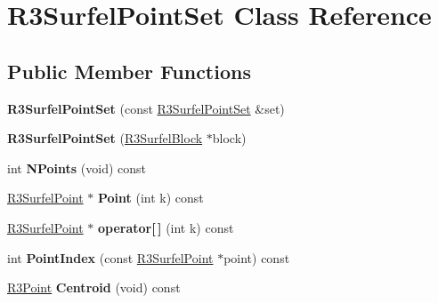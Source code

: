\hypertarget{class_r3_surfel_point_set}{}\section{R3\+Surfel\+Point\+Set Class Reference}
\label{class_r3_surfel_point_set}
\subsection*{Public Member Functions}
\begin{DoxyCompactItemize}
\item 
{\bfseries R3\+Surfel\+Point\+Set} (const \hyperlink{class_r3_surfel_point_set}{R3\+Surfel\+Point\+Set} \&set)\hypertarget{class_r3_surfel_point_set_aca27752edf5a20cb006bf2dd861d1ab7}{}\label{class_r3_surfel_point_set_aca27752edf5a20cb006bf2dd861d1ab7}

\item 
{\bfseries R3\+Surfel\+Point\+Set} (\hyperlink{class_r3_surfel_block}{R3\+Surfel\+Block} $\ast$block)\hypertarget{class_r3_surfel_point_set_a9202a9eb38944c936e6d5f233705d796}{}\label{class_r3_surfel_point_set_a9202a9eb38944c936e6d5f233705d796}

\item 
int {\bfseries N\+Points} (void) const \hypertarget{class_r3_surfel_point_set_ac24ae72dd6326f14c0cb5fcd57b3e8f0}{}\label{class_r3_surfel_point_set_ac24ae72dd6326f14c0cb5fcd57b3e8f0}

\item 
\hyperlink{class_r3_surfel_point}{R3\+Surfel\+Point} $\ast$ {\bfseries Point} (int k) const \hypertarget{class_r3_surfel_point_set_ac87fb27059c215f5292333df2b1ce216}{}\label{class_r3_surfel_point_set_ac87fb27059c215f5292333df2b1ce216}

\item 
\hyperlink{class_r3_surfel_point}{R3\+Surfel\+Point} $\ast$ {\bfseries operator\mbox{[}$\,$\mbox{]}} (int k) const \hypertarget{class_r3_surfel_point_set_a5bc3bf24d795fad638543c7e64cc6a9a}{}\label{class_r3_surfel_point_set_a5bc3bf24d795fad638543c7e64cc6a9a}

\item 
int {\bfseries Point\+Index} (const \hyperlink{class_r3_surfel_point}{R3\+Surfel\+Point} $\ast$point) const \hypertarget{class_r3_surfel_point_set_abaa764e9be10a61cc9b8fb5842a25212}{}\label{class_r3_surfel_point_set_abaa764e9be10a61cc9b8fb5842a25212}

\item 
\hyperlink{class_r3_point}{R3\+Point} {\bfseries Centroid} (void) const \hypertarget{class_r3_surfel_point_set_a6a554b82b3fc3ef42fedf7ed7f13ba24}{}\label{class_r3_surfel_point_set_a6a554b82b3fc3ef42fedf7ed7f13ba24}


\end{DoxyCompactItemize}
